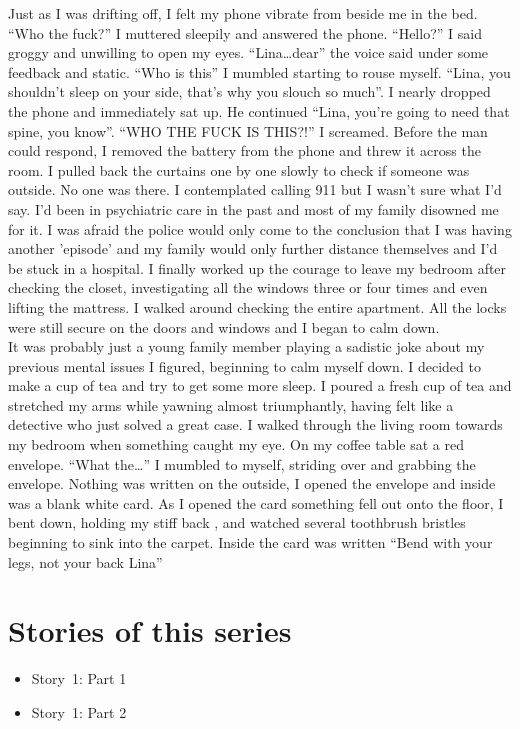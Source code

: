 \documentclass[a5paper]{scrartcl}
\begin{document}
Just as I was drifting off, I felt my phone vibrate from beside me in the bed. \enquote{Who the fuck?} I muttered sleepily and answered the phone. \enquote{Hello?} I said groggy and unwilling to open my eyes. \enquote{Lina\dots dear} the voice said under some feedback and static. \enquote{Who is this} I mumbled starting to rouse myself. \enquote{Lina, you shouldn't sleep on your side, that's why you slouch so much}. I nearly dropped the phone and immediately sat up. He continued \enquote{Lina, you're going to need that spine, you know}. \enquote{WHO THE FUCK IS THIS?!} I screamed. Before the man could respond, I removed the battery from the phone and threw it across the room. I pulled back the curtains one by one slowly to check if someone was outside. No one was there. I contemplated calling 911 but I wasn't sure what I'd say. I'd been in psychiatric care in the past and most of my family disowned me for it. I was afraid the police would only come to the conclusion that I was having another 'episode' and my family would only further distance themselves and I'd be stuck in a hospital. I finally worked up the courage to leave my bedroom after checking the closet, investigating all the windows three or four times and even lifting the mattress. I walked around checking the entire apartment. All the locks were still secure on the doors and windows and I began to calm down. \\


It was probably just a young family member playing a sadistic joke about my previous mental issues I figured, beginning to calm myself down. I decided to make a cup of tea and try to get some more sleep. I poured a fresh cup of tea and stretched my arms while yawning almost triumphantly, having felt like a detective who just solved a great case. I walked through the living room towards my bedroom when something caught my eye. On my coffee table sat a red envelope. \enquote{What the\dots} I mumbled to myself, striding over and grabbing the envelope. Nothing was written on the outside, I opened the envelope and inside was a blank white card. As I opened the card something fell out onto the floor, I bent down, holding my stiff back , and watched several toothbrush bristles beginning to sink into the carpet. Inside the card was written \enquote{Bend with your legs, not your back Lina}


\clearpage
\section*{Stories of this series}

\begin{itemize}
    \item Story~1: Part 1
    \item Story~1: Part 2
\end{itemize}
\end{document}
